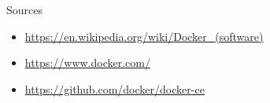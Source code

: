  \begin{frame}{Sources}
 \begin{itemize}
     \item \href{https://en.wikipedia.org/wiki/Docker_(software)}{https://en.wikipedia.org/wiki/Docker\_(software)}
     \item \href{https://www.docker.com/}{https://www.docker.com/}
     \item \href{https://github.com/docker/docker-ce}{https://github.com/docker/docker-ce}
 \end{itemize}
 \end{frame}
